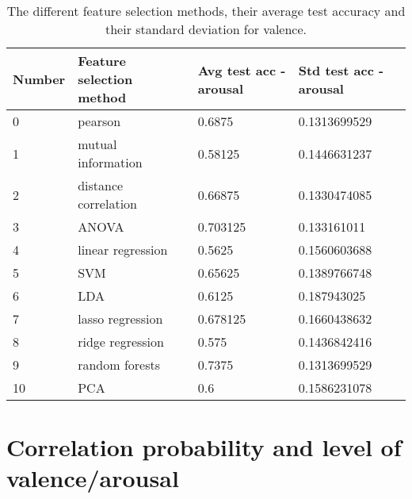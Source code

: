 \begin{table}[H]
\centering
\begin{tabular}{llll}
\textbf{Number} & \textbf{Feature selection method} & \textbf{Avg test acc - arousal} & \textbf{Std test acc - arousal} \\ \hline
0               & pearson                           & 0.6875                              & 0.1313699529                    \\
1               & mutual information                & 0.58125                             & 0.1446631237                    \\
2               & distance correlation              & 0.66875                             & 0.1330474085                    \\
3               & ANOVA                             & 0.703125                            & 0.133161011                     \\
4               & linear regression                 & 0.5625                              & 0.1560603688                    \\
5               & SVM                               & 0.65625                             & 0.1389766748                    \\
6               & LDA                               & 0.6125                              & 0.187943025                     \\
7               & lasso regression                  & 0.678125                            & 0.1660438632                    \\
8               & ridge regression                  & 0.575                               & 0.1436842416                    \\
9               & random forests                    & 0.7375                              & 0.1313699529                    \\
10              & PCA                               & 0.6                                 & 0.1586231078                   
\end{tabular}
\caption{The different feature selection methods, their average test accuracy and their standard deviation for valence\label{accCompLblvalence}.}
\end{table}

\section{Correlation probability and level of valence/arousal}

